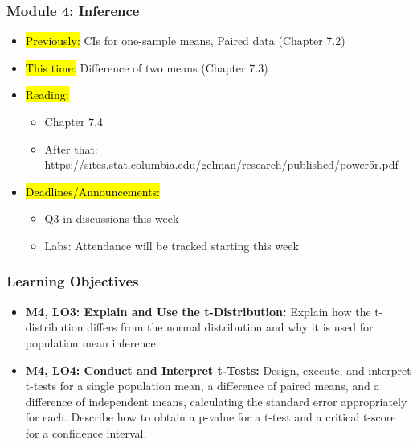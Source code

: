 
\begin{frame}
    \frametitle{Module 4: Inference}
    \begin{itemize}
        \item \hl{Previously: }CIs for one-sample means, Paired data (Chapter 7.2)
        \item \hl{This time: }Difference of two means (Chapter 7.3)
        \item \hl{Reading: }
        \begin{itemize}
            \item Chapter 7.4
            \item After that: https://sites.stat.columbia.edu/gelman/research/published/power5r.pdf
        \end{itemize}
        \item \hl{Deadlines/Announcements: }
        \begin{itemize}
            \item Q3 in discussions this week
            \item Labs: Attendance will be tracked starting this week
        \end{itemize}
    \end{itemize}

\end{frame}

\begin{frame}
    \frametitle{Learning Objectives}
    \begin{itemize}
        \item \textbf{M4, LO3: Explain and Use the t-Distribution:} Explain how the t-distribution differs from the normal distribution and why it is used for population mean inference.
        \item \textbf{M4, LO4: Conduct and Interpret t-Tests:} Design, execute, and interpret t-tests for a single population mean, a difference of paired means, and a difference of independent means, calculating the standard error appropriately for each. Describe how to obtain a p-value for a t-test and a critical t-score for a confidence interval.
    \end{itemize}
\end{frame}

